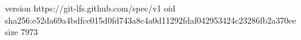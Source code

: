 version https://git-lfs.github.com/spec/v1
oid sha256:e52da69a4bdfce015d0fd743a8c4a0d11292fdaf042953424c23286fb2a370ee
size 7973
